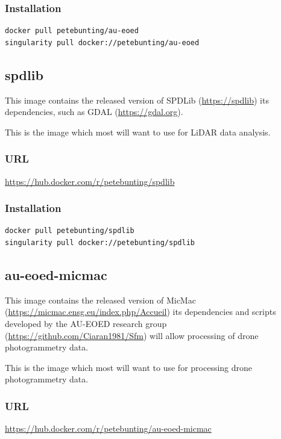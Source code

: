 \documentclass[authoryear, 11pt, oneside]{report}
\begin{document}
\subsubsection{Installation}

\begin{verbatim}
docker pull petebunting/au-eoed
singularity pull docker://petebunting/au-eoed
\end{verbatim}

\subsection{spdlib}

This image contains the released version of SPDLib (\url{https://spdlib}) its dependencies, such as GDAL (\url{https://gdal.org}). 

This is the image which most will want to use for LiDAR data analysis.

\subsubsection{URL}
\url{https://hub.docker.com/r/petebunting/spdlib}

\subsubsection{Installation}

\begin{verbatim}
docker pull petebunting/spdlib
singularity pull docker://petebunting/spdlib
\end{verbatim}


\subsection{au-eoed-micmac}

This image contains the released version of MicMac (\url{https://micmac.ensg.eu/index.php/Accueil}) its dependencies and scripts developed by the AU-EOED research group (\url{https://github.com/Ciaran1981/Sfm}) will allow processing of drone photogrammetry data. 

This is the image which most will want to use for processing drone photogrammetry data.

\subsubsection{URL}
\url{https://hub.docker.com/r/petebunting/au-eoed-micmac}
\end{document}
